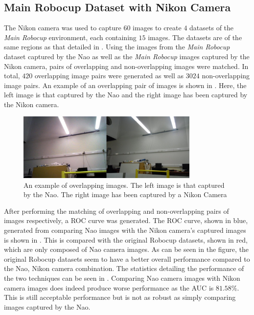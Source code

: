 \documentclass{report}
\begin{document}
\subsection{Main Robocup Dataset with Nikon Camera}
\label{sec:nikonRobocup}

The Nikon camera was used to capture $60$ images to create $4$ datasets of the \textit{Main Robocup} environment, each containing $15$ images. The datasets are of the same regions as that detailed in . Using the images from the \textit{Main Robocup} dataset captured by the Nao as well as the \textit{Main Robocup} images captured by the Nikon camera, pairs of overlapping and non-overlapping images were matched. In total, $420$ overlapping image pairs were generated as well as $3024$ non-overlapping image pairs. An example of an overlapping pair of images is shown in . Here, the left image is that captured by the Nao and the right image has been captured by the Nikon camera.\\

\begin{figure}[h!] 
  \centering
    \includegraphics[width=0.8\textwidth]{../Drawings/camera/compareRobocup.jpg}
    \caption{An example of overlapping images. The left image is that captured by the Nao. The right image has been captured by a Nikon Camera}
    \label{fig:cameraOverlapRobocup}
\end{figure}

After performing the matching of overlapping and non-overlapping pairs of images respectively, a ROC curve was generated. The ROC curve, shown in blue, generated from comparing Nao images with the Nikon camera's captured images is shown in . This is compared with the original Robocup datasets, shown in red, which are only composed of Nao camera images. As can be seen in the figure, the original Robocup datasets seem to have a better overall performance compared to the Nao, Nikon camera combination. The statistics detailing the performance of the two techniques can be seen in . Comparing Nao camera images with Nikon camera images does indeed produce worse performance as the AUC is $81.58\%$. This is still acceptable performance but is not as robust as simply comparing images captured by the Nao.\\
\end{document}
